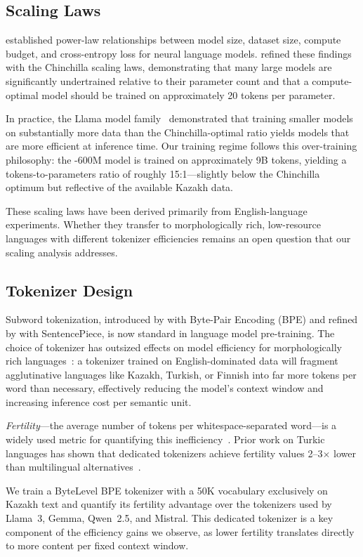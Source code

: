\subsection{Scaling Laws}

\citet{kaplan2020scaling} established power-law relationships between
model size, dataset size, compute budget, and cross-entropy loss for
neural language models.  \citet{hoffmann2022chinchilla} refined these
findings with the Chinchilla scaling laws, demonstrating that many
large models are significantly undertrained relative to their parameter
count and that a compute-optimal model should be trained on
approximately 20 tokens per parameter.

In practice, the Llama model family~\citep{touvron2023llama,
touvron2023llama2} demonstrated that training smaller models on
substantially more data than the Chinchilla-optimal ratio yields
models that are more efficient at inference time.  Our training regime
follows this over-training philosophy: the \sozkz{}-600M model is
trained on approximately 9B tokens, yielding a tokens-to-parameters
ratio of roughly 15:1---slightly below the Chinchilla optimum but
reflective of the available Kazakh data.

These scaling laws have been derived primarily from English-language
experiments.  Whether they transfer to morphologically rich,
low-resource languages with different tokenizer efficiencies remains
an open question that our scaling analysis addresses.

\subsection{Tokenizer Design}

Subword tokenization, introduced by \citet{sennrich2016bpe} with
Byte-Pair Encoding (BPE) and refined by
\citet{kudo2018sentencepiece} with SentencePiece, is now standard in
language model pre-training.  The choice of tokenizer has outsized
effects on model efficiency for morphologically rich
languages~\citep{rust2021tokenizer}: a tokenizer trained on
English-dominated data will fragment agglutinative languages like
Kazakh, Turkish, or Finnish into far more tokens per word than
necessary, effectively reducing the model's context window and
increasing inference cost per semantic unit.

\emph{Fertility}---the average number of tokens per whitespace-separated
word---is a widely used metric for quantifying this
inefficiency~\citep{acs2019fertility}.  Prior work on Turkic
languages has shown that dedicated tokenizers achieve fertility
values 2--3$\times$ lower than multilingual
alternatives~\citep{toraman2023turkic}.

We train a ByteLevel BPE tokenizer with a 50K vocabulary exclusively
on Kazakh text and quantify its fertility advantage over the
tokenizers used by Llama~3, Gemma, Qwen~2.5, and Mistral.  This
dedicated tokenizer is a key component of the efficiency gains we
observe, as lower fertility translates directly to more content per
fixed context window.
